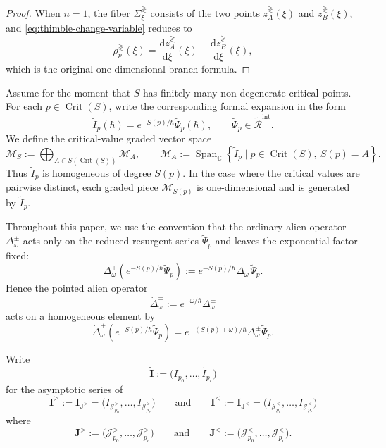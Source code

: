 \documentclass[11pt]{amsart}
\theoremstyle{plain}
\newcommand{\C}{\mathbb C}
\newcommand{\dd}{\mathrm d}
\newcommand{\Crit}{\operatorname{Crit}}
\newcommand{\J}{\mathcal J}
\begin{document}
\begin{proof}
When \(n=1\), the fiber \(\Sigma_{\xi}^{\gtrless}\) consists of the two points \(z_A^{\gtrless}(\xi)\) and \(z_B^{\gtrless}(\xi)\), and \eqref{eq:thimble-change-variable} reduces to
\[
\rho_p^{\gtrless}(\xi)
=
\frac{\dd z_A^{\gtrless}}{\dd\xi}(\xi)-\frac{\dd z_B^{\gtrless}}{\dd\xi}(\xi),
\]
which is the original one-dimensional branch formula.
\end{proof}

Assume for the
moment that \(S\) has finitely many non-degenerate critical points.  For each
\(p\in \Crit(S)\), write the corresponding formal expansion in the form
\[
\widetilde I_p(\hbar)
=
e^{-S(p)/\hbar}\widetilde\Psi_p(\hbar),
\qquad
\widetilde\Psi_p\in \widetilde{\mathcal R}^{\mathrm{int}}.
\]
We define the critical-value graded vector space
\[
\mathcal M_S
:=
\bigoplus_{A\in S(\Crit(S))}\mathcal M_A,
\qquad
\mathcal M_A
:=
\operatorname{Span}_{\C}
\left\{
\widetilde I_p \mid p\in\Crit(S),\ S(p)=A
\right\}.
\]
Thus \(\widetilde I_p\) is homogeneous of degree \(S(p)\).  In the case where
the critical values are pairwise distinct, each graded piece
\(\mathcal M_{S(p)}\) is one-dimensional and is generated by
\(\widetilde I_p\).

Throughout this paper, we use the convention that the ordinary alien operator
\(\Delta_\omega^\pm\) acts only on the reduced resurgent series 
\(\widetilde\Psi_p\) and leaves the exponential factor fixed:
\[
\Delta_\omega^\pm
\left(
e^{-S(p)/\hbar}\widetilde\Psi_p
\right)
:=
e^{-S(p)/\hbar}\Delta_\omega^\pm\widetilde\Psi_p.
\]
Hence the pointed alien operator
\[
\dot\Delta_\omega^\pm:=e^{-\omega/\hbar}\Delta_\omega^\pm
\]
acts on a homogeneous element by
\[
\dot\Delta_\omega^\pm
\left(
e^{-S(p)/\hbar}\widetilde\Psi_p
\right)
=
e^{-(S(p)+\omega)/\hbar}
\Delta_\omega^\pm\widetilde\Psi_p.
\]



Write
\begin{equation*}
\widetilde{\mathbf I}:=\bigl(\widetilde I_{p_0},\dots,\widetilde I_{p_r}\bigr)
\end{equation*}
for the asymptotic series of 
\begin{equation*}
\mathbf I^{>}:=\mathbf I_{\mathbf J^{>}}
=\bigl(I_{\J_{p_0}^>},\dots,I_{\J_{p_r}^>}\bigr) 
\qquad
\text{and}
\qquad
\mathbf I^{<}:=\mathbf I_{\mathbf J^{<}}=
\bigl(I_{\J_{p_0}^<},\dots,I_{\J_{p_r}^<}\bigr) 
\end{equation*}
where
\begin{equation*}
\mathbf J^{>}:=\bigl(\J_{p_0}^>,\dots,\J_{p_r}^>\bigr)
\qquad \text{and}
\qquad
\mathbf J^{<}:=\bigl(\J_{p_0}^<,\dots,\J_{p_r}^<\bigr).
\end{equation*}
\end{document}

